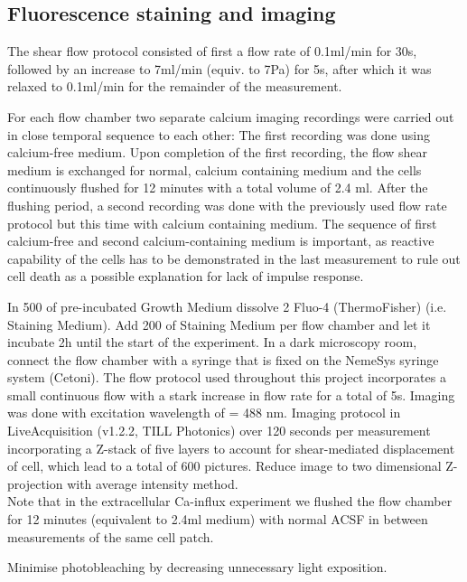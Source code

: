 \subsection{Fluorescence staining and imaging}
\label{sec:LiveImaging}

The shear flow protocol consisted of first a flow rate of 0.1ml/min for 30s, followed by an increase to 7ml/min (equiv. to 7Pa) for 5s, after which it was relaxed to 0.1ml/min for the remainder of the measurement. 



For each flow chamber two separate calcium imaging recordings were carried out in close temporal sequence to each other: The first recording was done using calcium-free medium. Upon completion of the first recording, the flow shear medium is exchanged for normal, calcium containing medium and the cells continuously flushed for 12 minutes with a total volume of 2.4 ml. After the flushing period, a second recording was done with the previously used flow rate protocol but this time with calcium containing medium. The sequence of first calcium-free and second calcium-containing medium is important, as reactive capability of the cells has to be demonstrated in the last measurement to rule out cell death as a possible explanation for lack of impulse response. 

In 500\mul{} of pre-incubated Growth Medium dissolve 2\mul{} Fluo-4 (ThermoFisher) (i.e. Staining Medium). Add 200\mul{} of Staining Medium per flow chamber and let it incubate 2h until the start of the experiment. 
 In a dark microscopy room, connect the flow chamber with a syringe that is fixed on the NemeSys syringe system (Cetoni). The flow protocol used throughout this project incorporates a small continuous flow with a stark increase in flow rate for a total of 5s. Imaging was done with excitation wavelength of \textlambda{} = 488 nm. Imaging protocol in LiveAcquisition (v1.2.2, TILL Photonics) over 120 seconds per measurement incorporating a Z-stack of five layers to account for shear-mediated displacement of cell, which lead to a total of 600 pictures. Reduce image to two dimensional Z-projection with average intensity method.  \\
Note that in the extracellular Ca-influx experiment we flushed the flow chamber for 12 minutes (equivalent to 2.4ml medium) with normal ACSF in between measurements of the same cell patch.

Minimise photobleaching by decreasing unnecessary light exposition.

